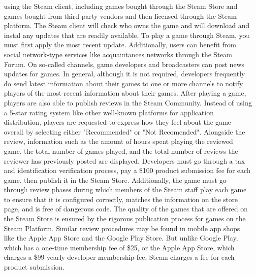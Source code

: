 \documentclass[runningheads]{llncs}
\begin{document}
using the Steam client, including games bought through the Steam Store and games bought from third-party vendors and then licensed through the Steam platform. The Steam client will check who owns the game and will download and instal any updates that are readily available. To play a game through Steam, you must first apply the most recent update. Additionally, users can benefit from social network-type services like acquaintances networks through the Steam Forum. On so-called channels, game developers and broadcasters can post news updates for games. In general, although it is not required, developers frequently do send latest information about their games to one or more channels to notify players of the most recent information about their games. After playing a game, players are also able to publish reviews in the Steam Community. Instead of using a 5-star rating system like other well-known platforms for application distribution, players are requested to express how they feel about the game overall by selecting either "Recommended" or "Not Recomended". Alongside the review, information such as the amount of hours spent playing the reviewed game, the total number of games played, and the total number of reviews the reviewer has previously posted are displayed. Developers must go through a tax and identification verification process, pay a \$100 product submission fee for each game, then publish it in the Steam Store. Additionally, the game must go through review phases during which members of the Steam staff play each game to ensure that it is configured correctly, matches the information on the store page, and is free of dangerous code. The quality of the games that are offered on the Steam Store is ensured by the rigorous publication process for games on the Steam Platform. Similar review procedures may be found in mobile app shops like the Apple App Store and the Google Play Store. But unlike Google Play, which has a one-time membership fee of \$25, or the Apple App Store, which charges a \$99 yearly developer membership fee, Steam charges a fee for each product submission. 
\end{document}
